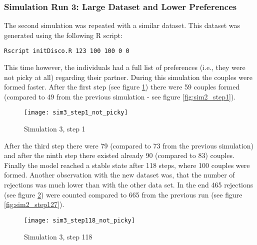 \clearpage
\subsubsection{Simulation Run 3: Large Dataset and Lower Preferences}
The second simulation was repeated with a similar dataset. 
This dataset was generated using the following R script:
%
\begin{verbatim}
Rscript initDisco.R 123 100 100 0 0
\end{verbatim}
%
This time however, the individuals had a full list of preferences (i.e., they were not picky at all) regarding their partner.
During this simulation the couples were formed faster. After the first step (see figure \ref{fig:sim3_step1_not_picky}) there were 59 couples formed (compared to 49 from the previous simulation - see figure \ref{fig:sim2_step1}).
\begin{figure}[H]
  \centering
  \texttt{[image: sim3\_step1\_not\_picky]}
	\caption{Simulation 3, step 1}
	\label{fig:sim3_step1_not_picky}
\end{figure}

After the third step there were 79 (compared to 73 from the previous simulation) and after the ninth step there existed already 90 (compared to 83) couples.
Finally the model reached a stable state after 118 steps, where 100 couples were formed.
Another observation with the new dataset was, that the number of rejections was much lower than with the other data set. 
In the end 465 rejections (see figure \ref{fig:sim3_step118_not_picky}) were counted compared to 665 from the previous run (see figure \ref{fig:sim2_step127}).
\begin{figure}[H]
  \centering
  \texttt{[image: sim3\_step118\_not\_picky]}
	\caption{Simulation 3, step 118}
	\label{fig:sim3_step118_not_picky}
\end{figure}
